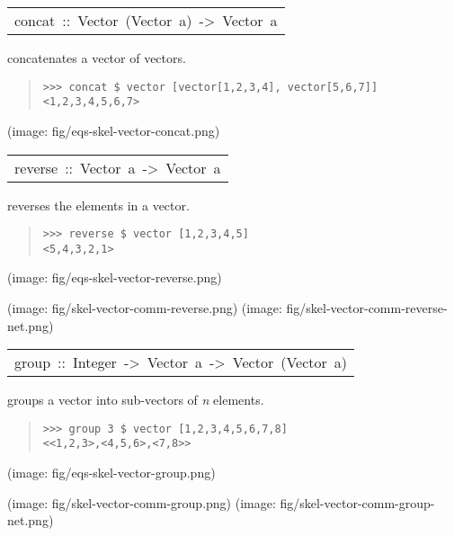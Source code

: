 \begin{haddockdesc}
\item[\begin{tabular}{@{}l}
concat\ ::\ Vector\ (Vector\ a)\ ->\ Vector\ a
\end{tabular}]\haddockbegindoc
concatenates a vector of vectors.\par
\begin{quote}
{\haddockverb\begin{verbatim}
>>> concat $ vector [vector[1,2,3,4], vector[5,6,7]]
<1,2,3,4,5,6,7>

\end{verbatim}}
\end{quote}(image: fig/eqs-skel-vector-concat.png)\par
           
\end{haddockdesc}
\begin{haddockdesc}
\item[\begin{tabular}{@{}l}
reverse\ ::\ Vector\ a\ ->\ Vector\ a
\end{tabular}]\haddockbegindoc
reverses the elements in a vector.\par
\begin{quote}
{\haddockverb\begin{verbatim}
>>> reverse $ vector [1,2,3,4,5]
<5,4,3,2,1>

\end{verbatim}}
\end{quote}(image: fig/eqs-skel-vector-reverse.png)\par
           (image: fig/skel-vector-comm-reverse.png)
 (image: fig/skel-vector-comm-reverse-net.png)\par
           
\end{haddockdesc}
\begin{haddockdesc}
\item[\begin{tabular}{@{}l}
group\ ::\ Integer\ ->\ Vector\ a\ ->\ Vector\ (Vector\ a)
\end{tabular}]\haddockbegindoc
groups a vector into sub-vectors of \emph{n} elements.\par
\begin{quote}
{\haddockverb\begin{verbatim}
>>> group 3 $ vector [1,2,3,4,5,6,7,8]
<<1,2,3>,<4,5,6>,<7,8>>

\end{verbatim}}
\end{quote}(image: fig/eqs-skel-vector-group.png)\par
           (image: fig/skel-vector-comm-group.png)
 (image: fig/skel-vector-comm-group-net.png)\par
           
\end{haddockdesc}
